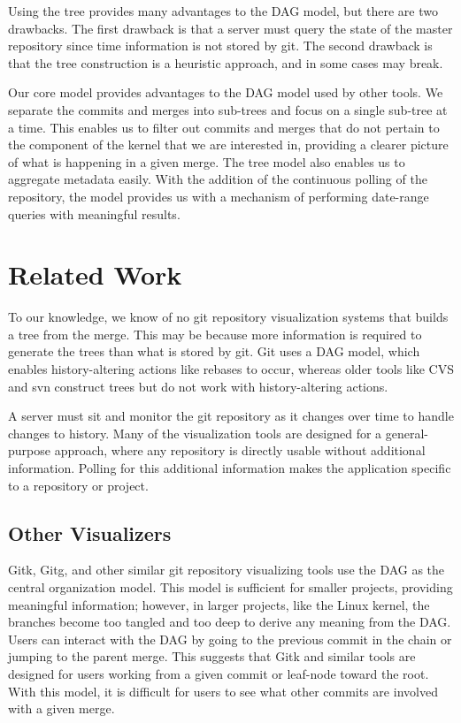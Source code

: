 \documentclass[conference, draftclsnofoot]{IEEEtran}
\begin{document}
Using the tree provides many advantages to the DAG model, but there are two
drawbacks. The first drawback is that a server must query the state of the master
repository since time information is not stored by git. The second drawback is that
the tree construction is a heuristic approach, and in some cases may break.

Our core model provides advantages to the DAG model used by other tools. We separate
the commits and merges into sub-trees and focus on a single sub-tree at a time. This
enables us to filter out commits and merges that do not pertain to the component of
the kernel that we are interested in, providing a clearer picture of what is
happening in a given merge. The tree model also enables us to aggregate metadata
easily. With the addition of the continuous polling of the repository, the model
provides us with a mechanism of performing date-range queries with meaningful
results.

\section{Related Work}

To our knowledge, we know of no git repository visualization systems that builds a
tree from the merge. This may be because more information is required to generate
the trees than what is stored by git. Git uses a DAG model, which enables
history-altering actions like rebases to occur, whereas older tools like CVS and svn
construct trees\cite{CVS2008} but do not work with history-altering actions.

A server must sit and monitor the git repository as it changes over time to handle
changes to history. Many of the visualization tools are designed for a
general-purpose approach, where any repository is directly usable without additional
information. Polling for this additional information makes the application specific
to a repository or project.

\subsection{Other Visualizers}

Gitk, Gitg, and other similar git repository visualizing tools use the DAG as the
central organization model. This model is sufficient for smaller projects, providing
meaningful information; however, in larger projects, like the Linux kernel, the
branches become too tangled and too deep to derive any meaning from the DAG. Users
can interact with the DAG by going to the previous commit in the chain or jumping to
the parent merge. This suggests that Gitk and similar tools are designed for users
working from a given commit or leaf-node toward the root. With this model, it is
difficult for users to see what other commits are involved with a given merge.
\end{document}
